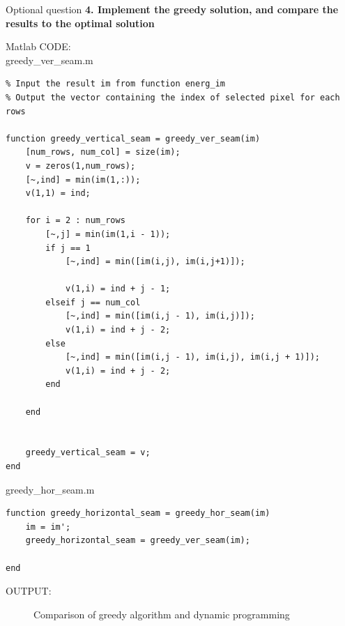 \documentclass[a4paper,12pt]{article}
\begin{document}
\clearpage
\begin{section}{Optional question}
\textbf{4. Implement the greedy solution, and compare the results to the optimal solution}

Matlab CODE:\\
greedy\_ver\_seam.m\\
\begin{lstlisting}[frame=single]  % Start your code-block
% Use Greedy solution to find the seam
% Input the result im from function energ_im
% Output the vector containing the index of selected pixel for each rows

function greedy_vertical_seam = greedy_ver_seam(im)
    [num_rows, num_col] = size(im);
    v = zeros(1,num_rows);
    [~,ind] = min(im(1,:)); 
    v(1,1) = ind;
    
    for i = 2 : num_rows
        [~,j] = min(im(1,i - 1));
        if j == 1
            [~,ind] = min([im(i,j), im(i,j+1)]);
            
            v(1,i) = ind + j - 1;
        elseif j == num_col
            [~,ind] = min([im(i,j - 1), im(i,j)]);
            v(1,i) = ind + j - 2;
        else
            [~,ind] = min([im(i,j - 1), im(i,j), im(i,j + 1)]);
            v(1,i) = ind + j - 2;
        end
        
    end
    
    
    greedy_vertical_seam = v;
end

\end{lstlisting}
greedy\_hor\_seam.m\\
\begin{lstlisting}[frame=single]  % Start your code-block
function greedy_horizontal_seam = greedy_hor_seam(im)
    im = im';
    greedy_horizontal_seam = greedy_ver_seam(im);
    
end

\end{lstlisting}

OUTPUT:\\


\begin{figure}[!htb]
        \caption{Comparison of greedy algorithm and dynamic programming}
      \end{figure}


\end{section}
\end{document}
